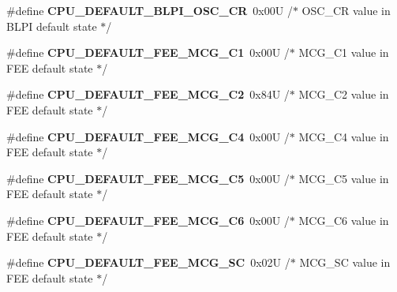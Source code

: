 \begin{DoxyCompactItemize}
\item 
\#define {\bfseries C\+P\+U\+\_\+\+D\+E\+F\+A\+U\+L\+T\+\_\+\+B\+L\+P\+I\+\_\+\+O\+S\+C\+\_\+\+CR}~0x00\+U     /$\ast$ O\+S\+C\+\_\+\+C\+R value in B\+L\+P\+I default state $\ast$/\hypertarget{group___c_p_u___config__module_ga8ab2b3a92ce251203b756669f7568e71}{}\label{group___c_p_u___config__module_ga8ab2b3a92ce251203b756669f7568e71}

\item 
\#define {\bfseries C\+P\+U\+\_\+\+D\+E\+F\+A\+U\+L\+T\+\_\+\+F\+E\+E\+\_\+\+M\+C\+G\+\_\+\+C1}~0x00\+U     /$\ast$ M\+C\+G\+\_\+\+C1 value in F\+E\+E default state $\ast$/\hypertarget{group___c_p_u___config__module_ga976c7505fe1cfe2faf76f513bb6f19e1}{}\label{group___c_p_u___config__module_ga976c7505fe1cfe2faf76f513bb6f19e1}

\item 
\#define {\bfseries C\+P\+U\+\_\+\+D\+E\+F\+A\+U\+L\+T\+\_\+\+F\+E\+E\+\_\+\+M\+C\+G\+\_\+\+C2}~0x84\+U     /$\ast$ M\+C\+G\+\_\+\+C2 value in F\+E\+E default state $\ast$/\hypertarget{group___c_p_u___config__module_ga6916584d6a3c94d28a86d94a35ceb462}{}\label{group___c_p_u___config__module_ga6916584d6a3c94d28a86d94a35ceb462}

\item 
\#define {\bfseries C\+P\+U\+\_\+\+D\+E\+F\+A\+U\+L\+T\+\_\+\+F\+E\+E\+\_\+\+M\+C\+G\+\_\+\+C4}~0x00\+U     /$\ast$ M\+C\+G\+\_\+\+C4 value in F\+E\+E default state $\ast$/\hypertarget{group___c_p_u___config__module_ga262bdd25adc65dc1631824b715eb5c38}{}\label{group___c_p_u___config__module_ga262bdd25adc65dc1631824b715eb5c38}

\item 
\#define {\bfseries C\+P\+U\+\_\+\+D\+E\+F\+A\+U\+L\+T\+\_\+\+F\+E\+E\+\_\+\+M\+C\+G\+\_\+\+C5}~0x00\+U     /$\ast$ M\+C\+G\+\_\+\+C5 value in F\+E\+E default state $\ast$/\hypertarget{group___c_p_u___config__module_gab2aec123a6b79575ebfc18718fcb4026}{}\label{group___c_p_u___config__module_gab2aec123a6b79575ebfc18718fcb4026}

\item 
\#define {\bfseries C\+P\+U\+\_\+\+D\+E\+F\+A\+U\+L\+T\+\_\+\+F\+E\+E\+\_\+\+M\+C\+G\+\_\+\+C6}~0x00\+U     /$\ast$ M\+C\+G\+\_\+\+C6 value in F\+E\+E default state $\ast$/\hypertarget{group___c_p_u___config__module_ga9ba2dcfe18276b71173ca90a0f0c054c}{}\label{group___c_p_u___config__module_ga9ba2dcfe18276b71173ca90a0f0c054c}

\item 
\#define {\bfseries C\+P\+U\+\_\+\+D\+E\+F\+A\+U\+L\+T\+\_\+\+F\+E\+E\+\_\+\+M\+C\+G\+\_\+\+SC}~0x02\+U     /$\ast$ M\+C\+G\+\_\+\+S\+C value in F\+E\+E default state $\ast$/\hypertarget{group___c_p_u___config__module_ga000adc876d92b9b62383586464de1c74}{}\label{group___c_p_u___config__module_ga000adc876d92b9b62383586464de1c74}


\end{DoxyCompactItemize}
